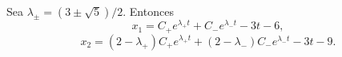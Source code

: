 Sea $\lambda_\pm=(3\pm\sqrt5)/2$. Entonces
\[x_1=C_+e^{\lambda_+t}+C_-e^{\lambda_-t}-3t-6,\]
\[x_2=(2-\lambda_+)C_+e^{\lambda_+t}+(2-\lambda_-)C_-e^{\lambda_-t}-3t-9.\]
